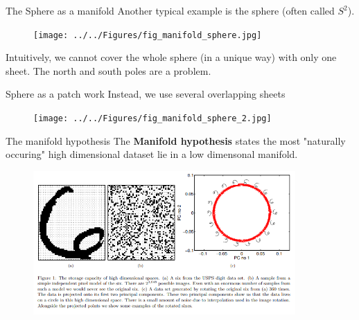 \documentclass{beamer}
\begin{document}
\begin{frame}{The Sphere as a manifold}
	Another typical example is the sphere (often called $S^2$).
	
\begin{figure}[h]
	\centering
	\texttt{[image: ../../Figures/fig\_manifold\_sphere.jpg]}
\end{figure}	
Intuitively, we cannot cover the whole sphere (in a unique way) with only one sheet. The north and south poles are a problem. 

\end{frame}

\begin{frame}{Sphere as a patch work}
	Instead, we use several overlapping sheets 
\begin{figure}[h]
	\centering
	\texttt{[image: ../../Figures/fig\_manifold\_sphere\_2.jpg]}
\end{figure}		
	
	
\end{frame}




\begin{frame}{The manifold hypothesis}
	The \textbf{Manifold hypothesis} states the most "naturally occuring" high dimensional dataset lie in a low dimensonal manifold.
	
	\begin{figure}[h]
		\centering
		\includegraphics[width=10cm]{../../Figures/fig_manifold_lawrence.png}
	\end{figure}		
	
	
	
\end{frame}
\end{document}
